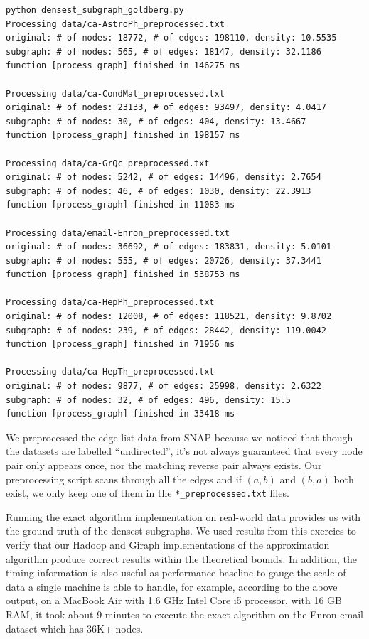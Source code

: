 \documentclass{article}
\begin{document}
\begin{lstlisting}[mathescape=true]
python densest_subgraph_goldberg.py
Processing data/ca-AstroPh_preprocessed.txt
original: # of nodes: 18772, # of edges: 198110, density: 10.5535
subgraph: # of nodes: 565, # of edges: 18147, density: 32.1186
function [process_graph] finished in 146275 ms

Processing data/ca-CondMat_preprocessed.txt
original: # of nodes: 23133, # of edges: 93497, density: 4.0417
subgraph: # of nodes: 30, # of edges: 404, density: 13.4667
function [process_graph] finished in 198157 ms

Processing data/ca-GrQc_preprocessed.txt
original: # of nodes: 5242, # of edges: 14496, density: 2.7654
subgraph: # of nodes: 46, # of edges: 1030, density: 22.3913
function [process_graph] finished in 11083 ms

Processing data/email-Enron_preprocessed.txt
original: # of nodes: 36692, # of edges: 183831, density: 5.0101
subgraph: # of nodes: 555, # of edges: 20726, density: 37.3441
function [process_graph] finished in 538753 ms

Processing data/ca-HepPh_preprocessed.txt
original: # of nodes: 12008, # of edges: 118521, density: 9.8702
subgraph: # of nodes: 239, # of edges: 28442, density: 119.0042
function [process_graph] finished in 71956 ms

Processing data/ca-HepTh_preprocessed.txt
original: # of nodes: 9877, # of edges: 25998, density: 2.6322
subgraph: # of nodes: 32, # of edges: 496, density: 15.5
function [process_graph] finished in 33418 ms
\end{lstlisting}

We preprocessed the edge list data from SNAP because we noticed that though the datasets are labelled ``undirected'', it's not always guaranteed that every node pair only appears once, nor the matching reverse pair always exists. Our preprocessing script scans through all the edges and if $(a, b)$ and $(b, a)$ both exist, we only keep one of them in the \texttt{*\_preprocessed.txt} files.

Running the exact algorithm implementation on real-world data provides us with the ground truth of the densest subgraphs. We used results from this exercies to verify that our Hadoop and Giraph implementations of the approximation algorithm produce correct results within the theoretical bounds. In addition, the timing information is also useful as performance baseline to gauge the scale of data a single machine is able to handle, for example, according to the above output, on a MacBook Air with 1.6 GHz Intel Core i5 processor, with 16 GB RAM, it took about 9 minutes to execute the exact algorithm on the Enron email dataset which has 36K+ nodes.
\end{document}
